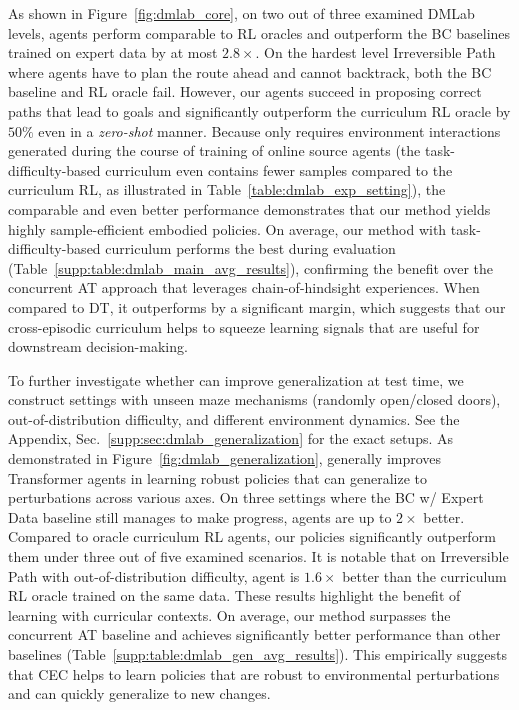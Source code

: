 \vspace{-0.5em}

 As shown in Figure~\ref{fig:dmlab_core},  on two out of three examined DMLab levels, \cec agents perform comparable to RL oracles and outperform the BC baselines trained on expert data by at most $2.8\times$.
On the hardest level Irreversible Path where agents have to plan the route ahead and cannot backtrack, both the BC baseline and RL oracle fail.
However, our agents succeed in proposing correct paths that lead to goals and significantly outperform the curriculum RL oracle by $50\%$ even in a \emph{zero-shot} manner.
Because \cec only requires environment interactions generated during the course of training of online source agents (the task-difficulty-based curriculum even contains fewer samples compared to the curriculum RL, as illustrated in Table~\ref{table:dmlab_exp_setting}), the comparable and even better performance demonstrates that our method yields highly sample-efficient embodied policies.
On average, our method with task-difficulty-based curriculum performs the best during evaluation (Table~\ref{supp:table:dmlab_main_avg_results}), confirming the benefit over the concurrent AT approach that leverages chain-of-hindsight experiences. When compared to DT, it outperforms by a significant margin, which suggests that our cross-episodic curriculum helps to squeeze learning signals that are useful for downstream decision-making.

\vspace{-0.5em}

To further investigate whether \cec can improve generalization at test time, we construct settings with unseen maze mechanisms (randomly open/closed doors), out-of-distribution difficulty, and different environment dynamics.
See the Appendix, Sec.~\ref{supp:sec:dmlab_generalization} for the exact setups.
As demonstrated in Figure~\ref{fig:dmlab_generalization}, \cec generally improves Transformer agents in learning robust policies that can generalize to perturbations across various axes.
On three settings where the BC w/ Expert Data baseline still manages to make progress, \cec agents are up to $2\times$ better.
Compared to oracle curriculum RL agents, our policies significantly outperform them under three out of five examined scenarios.
It is notable that on Irreversible Path with out-of-distribution difficulty, \cec agent is $1.6\times$ better than the curriculum RL oracle trained on the same data.
These results highlight the benefit of learning with curricular contexts.
On average, our method surpasses the concurrent AT baseline and achieves significantly better performance than other baselines (Table~\ref{supp:table:dmlab_gen_avg_results}). This empirically suggests that CEC helps to learn policies that are robust to environmental perturbations and can quickly generalize to new changes.

